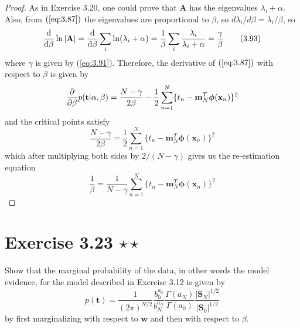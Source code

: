 \vspace{1em}

\begin{proof}
   As in Exercise 3.20, one could prove that $\mathbf{A}$ has the eigenvalues
   $\lambda_i + \alpha$. Also, from $(\ref{eq:3.87})$ the eigenvalues are proportional
   to $\beta$, so $d\lambda_i / d\beta = \lambda_i/\beta$, so
   \begin{equation*}
       \dv{\beta} \ln |\mathbf{A}| = \dv{\beta} \sum_i \ln (\lambda_i + \alpha)
       = \frac{1}{\beta} \sum_i \frac{\lambda_i}{\lambda_i + \alpha}
       = \frac{\gamma}{\beta}
        \tag{3.93}\label{eq:3.93}
   \end{equation*}
   where $\gamma$ is given by (\ref{eq:3.91}). Therefore, 
   the derivative of $(\ref{eq:3.87})$ with respect to $\beta$ is given by 
   \[
       \pdv{\beta} p(\mathbf{t} | \alpha, \beta)
       = \frac{N - \gamma}{2\beta} 
       - \frac{1}{2} \sum_{n=1}^{N}\{t_n - \mathbf{m}_N^T\bm{\phi}(\mathbf{x}_n)\}^2
   \] 
   and the critical points satisfy
   \[
       \frac{N - \gamma}{2\beta} =
       \frac{1}{2} \sum_{n=1}^{N}\{t_n - \mathbf{m}_N^T\bm{\phi}(\mathbf{x}_n)\}^2
   \] 
   which after multiplying both sides by $2/(N - \gamma)$ gives 
   us the re-estimation equation
   \begin{equation*}
       \frac{1}{\beta} = \frac{1}{N - \gamma} \sum_{n=1}^{N} 
       \{t_n - \mathbf{m}_N^T\bm{\phi}(\mathbf{x}_n)\}^2
        \tag{3.95}\label{eq:3.95}
   \end{equation*}
\end{proof}

\section*{Exercise 3.23 $\star \star$}
Show that the marginal probability of the data, in other words the model
evidence, for the model described in Exercise 3.12 is given by
\begin{equation*}
    p(\mathbf{t}) = \frac{1}{(2\pi)^{N / 2}} \frac{b_0^{a_0}}{b_N^{a_N}}
    \frac{\Gamma(a_N)}{\Gamma(a_0)} \frac{|\mathbf{S}_N|^{1/2}}{|\mathbf{S}_0|^{1/2}}
    \tag{3.118}\label{eq:3.118}
\end{equation*}
by first marginalizing with respect to $\mathbf{w}$ and then with
respect to $\beta$.

\vspace{1em}

